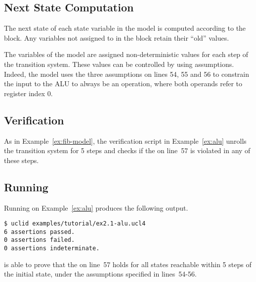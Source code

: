 \subsection{Next State Computation}
The next state of each state variable in the model is computed according to the  block. Any variables not assigned to in the  block retain their ``old'' values. 

The  variables of the model are assigned non-deterministic values for each step of the transition system. These values can be controlled by using assumptions. Indeed, the model uses the three assumptions on lines 54, 55 and 56 to constrain the input to the ALU to always be an  operation, where both operands refer to register index 0. 

\subsection{Verification}
As in Example~\ref{ex:fib-model}, the verification script in Example~\ref{ex:alu} unrolls the transition system for 5 steps and checks if the  on line~57 is violated in any of these steps. 

\subsection{Running \uclid{}}

Running \uclid{} on Example~\ref{ex:alu} produces the following output.

\begin{Verbatim}[frame=single, samepage=true]
$ uclid examples/tutorial/ex2.1-alu.ucl4 
6 assertions passed.
0 assertions failed.
0 assertions indeterminate.
\end{Verbatim}

\uclid{} is able to prove that the  on line~57 holds for all states reachable within 5 steps of the initial state, under the assumptions specified in lines~54-56.
